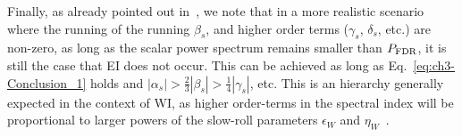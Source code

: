 {}Finally, as already pointed out in~\cite{Kinney:2014jya}, we note
that in a more realistic scenario where the running of the running
$\beta_s$, and higher order terms ($\gamma_s$, $\delta_s$, etc.) are
non-zero,  as long as the scalar power spectrum remains smaller than
$P_{\rm{FDR}}$, it is still the case that EI does not occur. This can
be achieved as long as Eq.~\ref{eq:ch3-Conclusion_1} holds and
$|\alpha_s|>\frac{2}{3}|\beta_s|>\frac{1}{4}|\gamma_s|$, etc. This is
an hierarchy generally  expected in the context of WI, as higher
order-terms in the spectral index will be proportional to larger
powers of the slow-roll parameters $\epsilon_W$ and
$\eta_W$~\cite{Das:2022ubr}.



